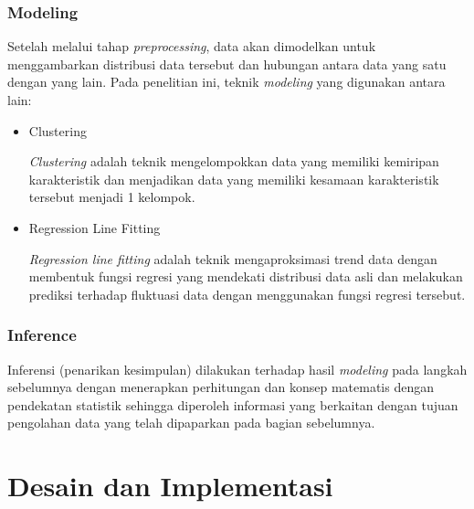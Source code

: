 \documentclass{article}
\begin{document}
\subsubsection{Modeling}
\begin{adjustwidth}{4em}{0pt}
	
\hspace{\parindent}Setelah melalui tahap \textit{preprocessing}, data akan dimodelkan untuk menggambarkan distribusi data tersebut dan hubungan antara data yang satu dengan yang lain. Pada penelitian ini, teknik \textit{modeling} yang digunakan antara lain: 

\begin{itemize}
	\item{Clustering}
	
	\textit{Clustering} adalah teknik mengelompokkan data yang memiliki kemiripan karakteristik dan menjadikan data yang memiliki kesamaan karakteristik tersebut menjadi 1 kelompok.
	
	\item{Regression Line Fitting}
	
	\textit{Regression line fitting} adalah teknik mengaproksimasi trend data dengan membentuk fungsi regresi yang mendekati distribusi data asli dan melakukan prediksi terhadap fluktuasi data dengan menggunakan fungsi regresi tersebut.
	
\end{itemize}

\end{adjustwidth}

\subsubsection{Inference}

\begin{adjustwidth}{4em}{0pt}
	
\hspace{\parindent}Inferensi (penarikan kesimpulan) dilakukan terhadap hasil \textit{modeling} pada langkah sebelumnya dengan menerapkan perhitungan dan konsep matematis dengan pendekatan statistik sehingga diperoleh informasi yang berkaitan dengan tujuan pengolahan data yang telah dipaparkan pada bagian sebelumnya.

\end{adjustwidth}

\section{Desain dan Implementasi}
\end{document}
